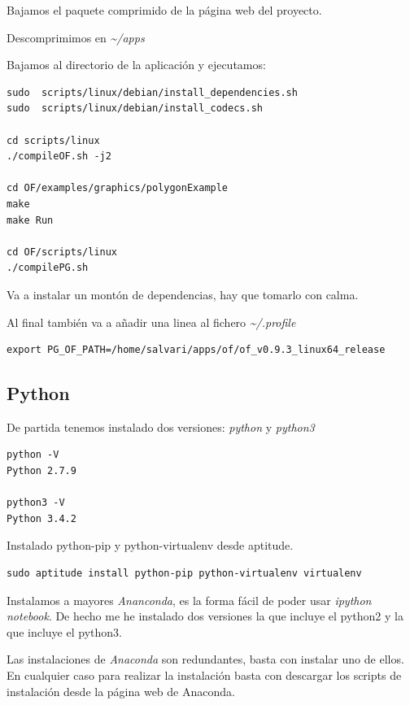 \documentclass[12pt,spanish,]{article}
\begin{document}
Bajamos el paquete comprimido de la página web del proyecto.

Descomprimimos en \emph{\textasciitilde{}/apps}

Bajamos al directorio de la aplicación y ejecutamos:

\begin{verbatim}
sudo  scripts/linux/debian/install_dependencies.sh
sudo  scripts/linux/debian/install_codecs.sh

cd scripts/linux
./compileOF.sh -j2

cd OF/examples/graphics/polygonExample
make
make Run

cd OF/scripts/linux
./compilePG.sh
\end{verbatim}

Va a instalar un montón de dependencias, hay que tomarlo con calma.

Al final también va a añadir una linea al fichero
\emph{\textasciitilde{}/.profile}

\begin{verbatim}
export PG_OF_PATH=/home/salvari/apps/of/of_v0.9.3_linux64_release
\end{verbatim}

\subsection{Python}\label{python}

De partida tenemos instalado dos versiones: \emph{python} y
\emph{python3}

\begin{verbatim}
python -V
Python 2.7.9

python3 -V
Python 3.4.2
\end{verbatim}

Instalado python-pip y python-virtualenv desde aptitude.

\begin{verbatim}
sudo aptitude install python-pip python-virtualenv virtualenv
\end{verbatim}

Instalamos a mayores \emph{Ananconda}, es la forma fácil de poder usar
\emph{ipython notebook}. De hecho me he instalado dos versiones la que
incluye el python2 y la que incluye el python3.

Las instalaciones de \emph{Anaconda} son redundantes, basta con instalar
uno de ellos. En cualquier caso para realizar la instalación basta con
descargar los scripts de instalación desde la página web de Anaconda.
\end{document}
